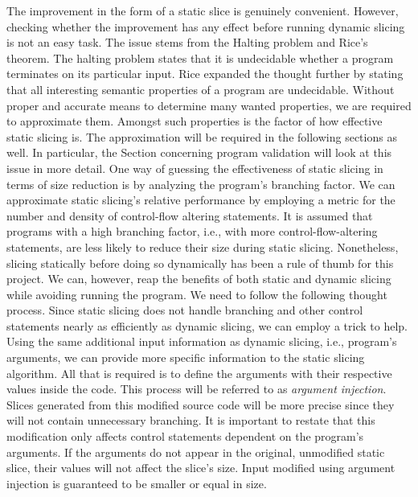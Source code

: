 
The improvement in the form of a static slice is genuinely convenient.  
However, checking whether the improvement has any effect before running 
dynamic slicing is not an easy task.  
The issue stems from the Halting problem and Rice's theorem.  
The halting problem states that it is undecidable whether a program 
terminates on its particular input.  
Rice expanded the thought further by stating that all interesting semantic 
properties of a program are undecidable. 
Without proper and accurate means to determine many wanted properties, we 
are required to approximate them. 
Amongst such properties is the factor of how effective static slicing is.  
The approximation will be required in the following sections as well.  
In particular, the Section concerning program validation will look at this 
issue in more detail.  
One way of guessing the effectiveness of static slicing in terms of size 
reduction is by analyzing the program's branching factor. 
We can approximate static slicing's relative performance by employing 
a metric for the number and density of control-flow altering statements.  
It is assumed that programs with a high branching factor, i.e., with more 
control-flow-altering statements, are less likely to reduce their size 
during static slicing.
Nonetheless, slicing statically before doing so dynamically has been a rule 
of thumb for this project.  
We can, however, reap the benefits of both static and dynamic slicing while 
avoiding running the program. 
We need to follow the following thought process. 
Since static slicing does not handle branching and other control statements 
nearly as efficiently as dynamic slicing, we can employ a trick to help.  
Using the same additional input information as dynamic slicing, i.e., 
program's arguments, we can provide more specific information to the static 
slicing algorithm.  
All that is required is to define the arguments with their respective values 
inside the code. 
This process will be referred to as \emph{argument injection}. 
Slices generated from this modified source code will be more precise since 
they will not contain unnecessary branching.  
It is important to restate that this modification only affects control 
statements dependent on the program's arguments.  
If the arguments do not appear in the original, unmodified static slice, 
their values will not affect the slice's size.  
Input modified using argument injection is guaranteed to be smaller or equal 
in size.

